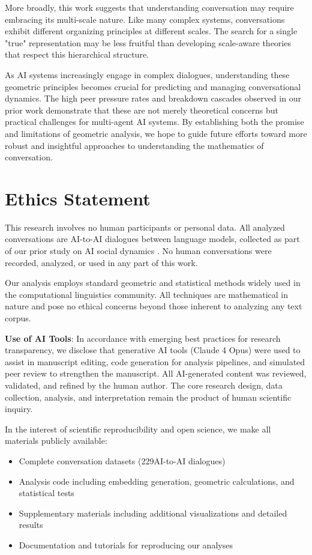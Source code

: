 \documentclass[11pt,letterpaper]{article}
\newcommand{\totalConversations}{229}
\begin{document}
More broadly, this work suggests that understanding conversation may require embracing its multi-scale nature. Like many complex systems, conversations exhibit different organizing principles at different scales. The search for a single "true" representation may be less fruitful than developing scale-aware theories that respect this hierarchical structure.

As AI systems increasingly engage in complex dialogues, understanding these geometric principles becomes crucial for predicting and managing conversational dynamics. The high peer pressure rates and breakdown cascades observed in our prior work demonstrate that these are not merely theoretical concerns but practical challenges for multi-agent AI systems. By establishing both the promise and limitations of geometric analysis, we hope to guide future efforts toward more robust and insightful approaches to understanding the mathematics of conversation.

\section{Ethics Statement}

This research involves no human participants or personal data. All analyzed conversations are AI-to-AI dialogues between language models, collected as part of our prior study on AI social dynamics \citep{garcia2025peer}. No human conversations were recorded, analyzed, or used in any part of this work.

Our analysis employs standard geometric and statistical methods widely used in the computational linguistics community. All techniques are mathematical in nature and pose no ethical concerns beyond those inherent to analyzing any text corpus.

\textbf{Use of AI Tools}: In accordance with emerging best practices for research transparency, we disclose that generative AI tools (Claude 4 Opus) were used to assist in manuscript editing, code generation for analysis pipelines, and simulated peer review to strengthen the manuscript. All AI-generated content was reviewed, validated, and refined by the human author. The core research design, data collection, analysis, and interpretation remain the product of human scientific inquiry.

In the interest of scientific reproducibility and open science, we make all materials publicly available:
\begin{itemize}
\item Complete conversation datasets (\totalConversations AI-to-AI dialogues)
\item Analysis code including embedding generation, geometric calculations, and statistical tests
\item Supplementary materials including additional visualizations and detailed results
\item Documentation and tutorials for reproducing our analyses
\end{itemize}
\end{document}
